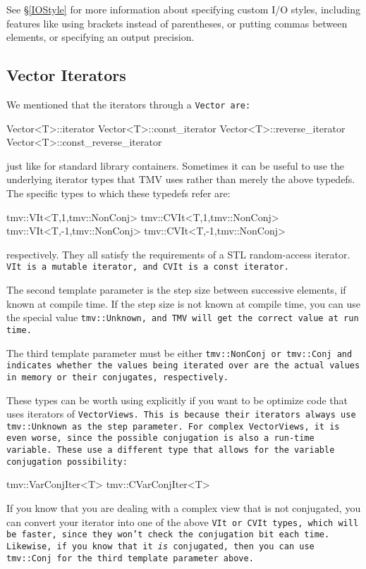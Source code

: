 See \S\ref{IOStyle} for more information about specifying custom I/O styles, including
features like using brackets instead of parentheses, or putting commas between elements,
or specifying an output precision.  

\subsection{Vector Iterators}
\label{VectorIterators}

We mentioned that the iterators through a \tt{Vector} are:
\begin{tmvcode}
Vector<T>::iterator
Vector<T>::const_iterator
Vector<T>::reverse_iterator
Vector<T>::const_reverse_iterator
\end{tmvcode}
just like for standard library containers.  Sometimes it can be useful to use the underlying iterator types that TMV uses rather than merely the above typedefs.  The specific types to which these
typedefs refer are:
\begin{tmvcode}
tmv::VIt<T,1,tmv::NonConj>
tmv::CVIt<T,1,tmv::NonConj>
tmv::VIt<T,-1,tmv::NonConj>
tmv::CVIt<T,-1,tmv::NonConj>
\end{tmvcode}
respectively.  They all satisfy the requirements of a STL random-access iterator.
\tt{VIt} is a mutable iterator, and \tt{CVIt} is a const iterator.

The second template parameter is the step size between successive elements, if known at compile time.  If the step size is not known at compile time, you can use the special value \tt{tmv::Unknown}, and TMV will get the correct value at run time.  

The third template parameter must be either \tt{tmv::NonConj} or \tt{tmv::Conj} and indicates whether the values being iterated over are the actual values in memory or their conjugates, respectively.

These types can be worth using explicitly if you want to be optimize code that uses iterators of \tt{VectorView}s.
This is because their iterators always use \tt{tmv::Unknown} as the step parameter.  For complex \tt{VectorView}s, it is even worse, since the possible conjugation is also a run-time variable.  These use a different type that allows for the variable conjugation possibility:
\begin{tmvcode}
tmv::VarConjIter<T>
tmv::CVarConjIter<T>
\end{tmvcode}

If you know that you are dealing with a complex view that is not conjugated, you can 
convert your iterator into one of the above \tt{VIt} or \tt{CVIt} types, which will be 
faster, since they won't check the conjugation bit each time. 
Likewise, if you
know that it {\em is} conjugated, then you can use \tt{tmv::Conj} for the 
third template parameter above.

